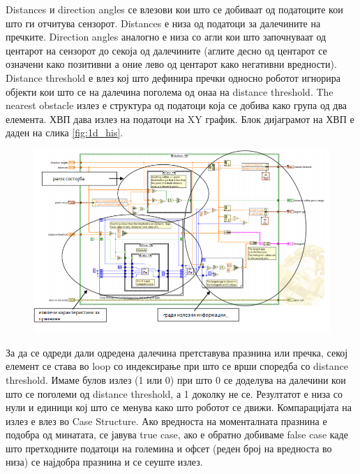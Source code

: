 \documentclass{article}
\begin{document}
Distances и direction angles се влезови кои што се добиваат од податоците кои што ги отчитува сензорот. Distances е низа од податоци за далечините на пречките. Direction angles аналогно е низа со агли кои што започнуваат од центарот на сензорот до секоја од далечините (аглите десно од центарот се означени како позитивни а оние лево од центарот како негативни вредности). Distance threshold е влез кој што дефинира пречки односно роботот игнорира објекти кои што се на далечина поголема од онаа на distance threshold. 
The nearest obstacle излез е структура од податоци која се добива како група од два елемента. ХВП дава излез на податоци на XY график. Блок дијаграмот на ХВП е даден на слика \ref{fig:1d_his}.

\begin{figure}[H]
\centering
\includegraphics[width=0.75\linewidth]{vfh.png}
\label{fig:vfh.png}
\end{figure}

За да се одреди дали одредена далечина претставува празнина или пречка, секој елемент се става во loop со индексирање при што се врши споредба со distance threshold. Имаме булов излез (1 или 0) при што 0 се доделува на далечини кои што се поголеми од distance threshold, а 1 доколку не се. Резултатот е низа со нули и единици кој што се менува како што роботот се движи. Компарацијата на излез е влез во Case Structure. Ако вредноста на моменталната празнина е подобра од минатата, се јавува true case, ако е обратно добиваме false case каде што претходните податоци на големина и офсет (реден број на вредноста во низа) се најдобра празнина и се сеуште излез.

\end{document}

